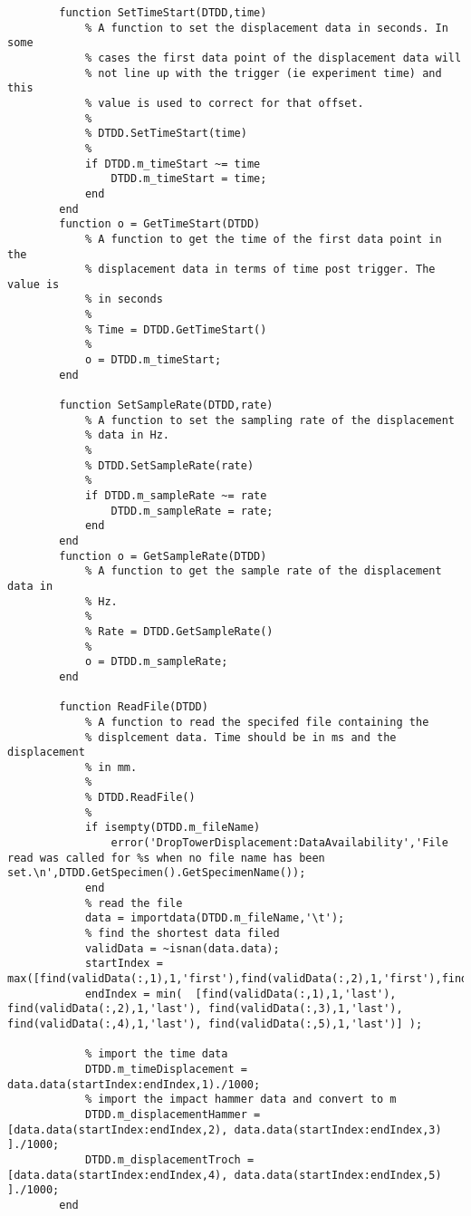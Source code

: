 \begin{lstlisting}
        function SetTimeStart(DTDD,time)
            % A function to set the displacement data in seconds. In some
            % cases the first data point of the displacement data will
            % not line up with the trigger (ie experiment time) and this
            % value is used to correct for that offset.
            %
            % DTDD.SetTimeStart(time)
            %
            if DTDD.m_timeStart ~= time
                DTDD.m_timeStart = time;
            end
        end
        function o = GetTimeStart(DTDD)
            % A function to get the time of the first data point in the
            % displacement data in terms of time post trigger. The value is
            % in seconds
            %
            % Time = DTDD.GetTimeStart()
            %
            o = DTDD.m_timeStart;
        end
        
        function SetSampleRate(DTDD,rate)
            % A function to set the sampling rate of the displacement
            % data in Hz.
            %
            % DTDD.SetSampleRate(rate)
            %
            if DTDD.m_sampleRate ~= rate
                DTDD.m_sampleRate = rate;
            end
        end
        function o = GetSampleRate(DTDD)
            % A function to get the sample rate of the displacement data in
            % Hz.
            %
            % Rate = DTDD.GetSampleRate()
            %
            o = DTDD.m_sampleRate;
        end
        
        function ReadFile(DTDD)
            % A function to read the specifed file containing the
            % displcement data. Time should be in ms and the displacement
            % in mm.
            %
            % DTDD.ReadFile()
            %
            if isempty(DTDD.m_fileName)
                error('DropTowerDisplacement:DataAvailability','File read was called for %s when no file name has been set.\n',DTDD.GetSpecimen().GetSpecimenName());
            end
            % read the file
            data = importdata(DTDD.m_fileName,'\t');
            % find the shortest data filed
            validData = ~isnan(data.data);
            startIndex = max([find(validData(:,1),1,'first'),find(validData(:,2),1,'first'),find(validData(:,3),1,'first'),find(validData(:,4),1,'first'),find(validData(:,5),1,'first')]);
            endIndex = min(  [find(validData(:,1),1,'last'), find(validData(:,2),1,'last'), find(validData(:,3),1,'last'), find(validData(:,4),1,'last'), find(validData(:,5),1,'last')] );                
            
            % import the time data
            DTDD.m_timeDisplacement = data.data(startIndex:endIndex,1)./1000;
            % import the impact hammer data and convert to m
            DTDD.m_displacementHammer = [data.data(startIndex:endIndex,2), data.data(startIndex:endIndex,3) ]./1000;
            DTDD.m_displacementTroch = [data.data(startIndex:endIndex,4), data.data(startIndex:endIndex,5) ]./1000;
        end
        

\end{lstlisting}

